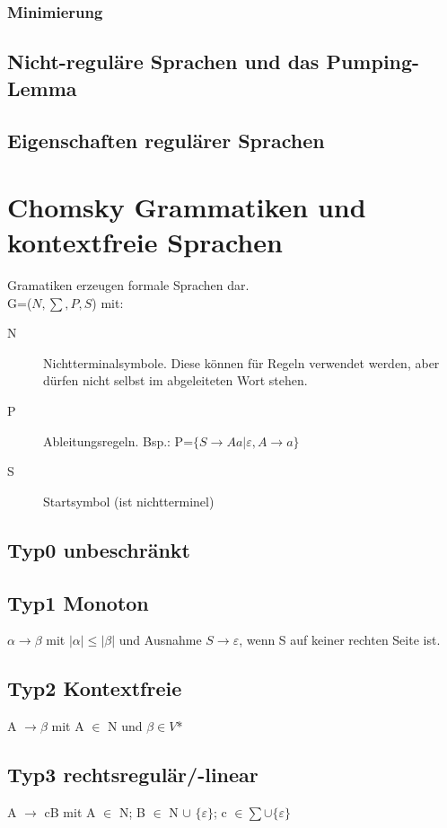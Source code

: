 \documentclass[12pt,a4paper]{article}
\begin{document}
\subsubsection{Minimierung}

\subsection{Nicht-reguläre Sprachen und das Pumping-Lemma}

\subsection{Eigenschaften regulärer Sprachen}

\section{Chomsky Grammatiken und kontextfreie Sprachen}
	Gramatiken erzeugen formale Sprachen dar.\\
	G=($N, \sum , P, S$) mit:\\
	\begin{description}
		\item[N] Nichtterminalsymbole. Diese können für Regeln verwendet werden, aber dürfen nicht selbst im abgeleiteten Wort stehen.
		\item[P] Ableitungsregeln. Bsp.: P=$\{ S \rightarrow Aa | \varepsilon , A \rightarrow a \} $ 
		\item[S] Startsymbol (ist nichtterminel)
	\end{description}

	\subsection{Typ0 unbeschränkt}
    \subsection{Typ1 Monoton}
    $\alpha \rightarrow \beta$ mit $| \alpha | \leq  | \beta |$ und Ausnahme $S \rightarrow \varepsilon$, wenn S auf keiner rechten Seite ist.
    \subsection{Typ2 Kontextfreie}
	A $\rightarrow \beta$ mit A $\in$ N und $\beta \in V$* 
    \subsection{Typ3 rechtsregulär/-linear}
	A $\rightarrow$ cB mit A $\in$ N; B $\in$ N $\cup$ $\{ \varepsilon \}$; c $\in \sum \cup \{ \varepsilon \}$
\end{document}
